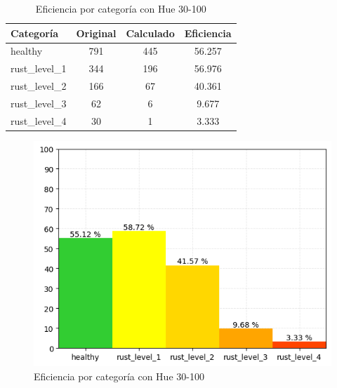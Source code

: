 \captionsetup[figure]{skip=10pt}

\begin{table}[H]
\centering
\begin{tabular}{|l|c|c|c|}
\hline 
\textbf{Categoría} & \textbf{Original} & \textbf{Calculado} & \textbf{Eficiencia} \\
\hline
healthy & 791 & 445 & 56.257 \\
\hline 
rust\_level\_1 & 344 & 196 & 56.976 \\
\hline 
rust\_level\_2 & 166 & 67 & 40.361 \\
\hline 
rust\_level\_3 & 62 & 6 & 9.677 \\
\hline 
rust\_level\_4 & 30 & 1 & 3.333 \\
\hline 
\end{tabular}
\caption{Eficiencia por categoría con Hue 30-100}
\label{table:efficiency_categories_30_100}
\end{table}

\begin{figure}[H]
\centering
\includegraphics[scale=0.6]{images/result_classes_30_100.png}
\caption{Eficiencia por categoría con Hue 30-100}
\label{img:efficiency_categories_30_100}
\end{figure}
